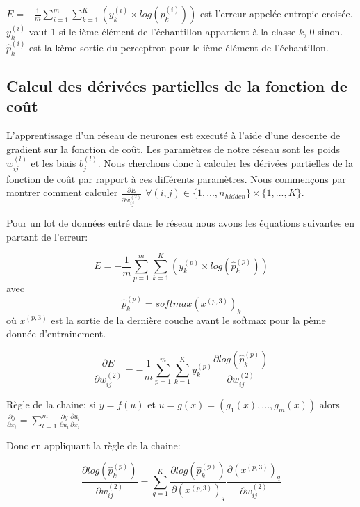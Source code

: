\documentclass[a4paper,11pt,oneside,roman]{article}
\begin{document}
    $E = -\frac{1}{m} \sum\limits_{i=1}^m\sum\limits_{k=1}^K (y_{k}^{(i)} \times log(\hat{p}_{k}^{(i)}))$ est l'erreur appelée entropie croisée.
    $y_{k}^{(i)}$ vaut 1 si le ième élément de l'échantillon appartient à la classe $k$, 0 sinon. $\hat{p}_{k}^{(i)}$ est la kème sortie du perceptron pour le ième élément de l'échantillon.

    \subsection{Calcul des dérivées partielles de la fonction de coût}

    L'apprentissage d'un réseau de neurones est executé à l'aide d'une descente de gradient sur la fonction de coût. Les paramètres de notre réseau sont les poids $w_{ij}^{(l)}$ et les biais $b_j^{(l)}$.
    Nous cherchons donc à calculer les dérivées partielles de la fonction de coût par rapport à ces différents paramètres. Nous commençons par montrer comment calculer $\frac{\partial E}{\partial w_{ij}^{(2)}}$ $\forall (i,j) \in \{1, ..., n_{hidden}\} \times \{1, ..., K\}.$

    Pour un lot de données entré dans le réseau nous avons les équations suivantes en partant de l'erreur:
    
    \begin{equation}
        E = -\frac{1}{m} \sum\limits_{p=1}^m\sum\limits_{k=1}^K (y_{k}^{(p)} \times log(\hat{p}_{k}^{(p)}))
    \end{equation}
avec 
    \begin{equation}
        \hat{p}_{k}^{(p)} = softmax(x^{(p,3)})_k
    \end{equation}
    où $x^{(p,3)}$ est la sortie de la dernière couche avant le softmax pour la pème donnée d'entrainement.

    \begin{equation}
        \frac{\partial E}{\partial w_{ij}^{(2)}} = -\frac{1}{m} \sum\limits_{p=1}^{m} \sum\limits_{k=1}^{K} y_k^{(p)} \frac{\partial log(\hat{p}_{k}^{(p)})}{\partial w_{ij}^{(2)}}
    \end{equation}

    Règle de la chaine:
    si $y = f(u)$ et $u=g(x)=(g_1(x), ..., g_m(x))$ alors $\frac{\partial y}{\partial x_i} = \sum\limits_{l=1}^{m} \frac{\partial y}{\partial u_l} \frac{\partial u_l}{\partial x_i}$
    
    Donc en appliquant la règle de la chaine:
    
    \begin{equation}
        \frac{\partial log(\hat{p}_{k}^{(p)})}{\partial w_{ij}^{(2)}} = \sum\limits_{q=1}^{K} \frac{\partial log(\hat{p}_{k}^{(p)})}{\partial (x^{(p,3)})_{q}} \frac{\partial (x^{(p,3)})_{q}}{\partial w_{ij}^{(2)}}
    \end{equation}
    
\end{document}
